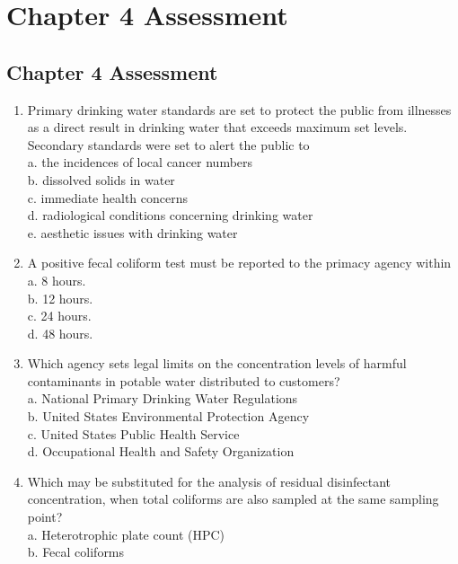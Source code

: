 
\chapter*{Chapter 4 Assessment}

\section*{Chapter 4 Assessment}
\begin{enumerate}[1.]
\item Primary drinking water standards are set to protect the public from illnesses as a direct result in drinking water that exceeds maximum set levels. Secondary standards were set to alert the public to\\
a. the incidences of local cancer numbers\\
b. dissolved solids in water\\
c. immediate health concerns\\
d. radiological conditions concerning drinking water\\
e. aesthetic issues with drinking water\\
\item A positive fecal coliform test must be reported to the primacy agency within\\
a. 8 hours.\\
b. 12 hours.\\
c. 24 hours.\\
d. 48 hours.\\
\item Which agency sets legal limits on the concentration levels of harmful contaminants in potable water distributed to customers?\\
a. National Primary Drinking Water Regulations\\
b. United States Environmental Protection Agency\\
c. United States Public Health Service\\
d. Occupational Health and Safety Organization\\
\item Which may be substituted for the analysis of residual disinfectant concentration, when total coliforms are also sampled at the same sampling point?\\
a. Heterotrophic plate count (HPC)\\
b. Fecal coliforms\\

\end{enumerate}
